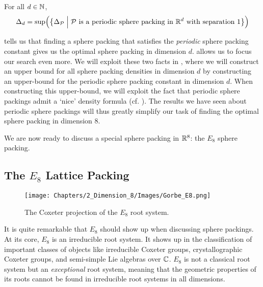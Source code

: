 \begin{boxproposition}\label{Ch2:Prop:Scaling_Periodic_Constant}
    For all $d \in \mathbb{N}$,
    \begin{align*}
        \Delta_{d} = \sup\!\left( {\left\{ \Delta_{\mathcal{P}} \; \middle\vert \; \mathcal{P} \text{ is a periodic sphere packing in } \mathbb{R}^d \text{ with separation } 1 \right\}} \right)
    \end{align*}
\end{boxproposition}

 tells us that finding a sphere packing that satisfies the \textit{periodic} sphere packing constant gives us the optimal sphere packing in dimension $d$.  allows us to focus our search even more. We will exploit these two facts in , where we will construct an upper bound for all sphere packing densities in dimension $d$ by constructing an upper-bound for the periodic sphere packing constant in dimension $d$. When constructing this upper-bound, we will exploit the fact that periodic sphere packings admit a `nice' density formula (cf. ). The results we have seen about periodic sphere packings will thus greatly simplify our task of finding the optimal sphere packing in dimension $8$.

We are now ready to discuss a special sphere packing in $\mathbb{R}^8$: the $E_8$ sphere packing.

\subsection{The $E_8$ Lattice Packing}\label{Ch2:Subsec:E8}

\begin{wrapfigure}[18]{r}{0.5\linewidth}
    \vspace{-3em}
    \centering
    \texttt{[image: Chapters/2\_Dimension\_8/Images/Gorbe\_E8.png]}
    \caption{The Coxeter projection of the $E_8$ root system. \cite{Gorbe_E8}}
    \label{Ch2:Fig:Gorbe_E8}
\end{wrapfigure}

It is quite remarkable that $E_8$ should show up when discussing sphere packings. At its core, $E_8$ is an irreducible root system. It shows up in the classification of important classes of objects like irreducible Coxeter groups, crystallographic Coxeter groups, and semi-simple Lie algebras over $\mathbb{C}$. $E_8$ is not a classical root system but an \textit{exceptional} root system, meaning that the geometric properties of its roots cannot be found in irreducible root systems in all dimensions.

